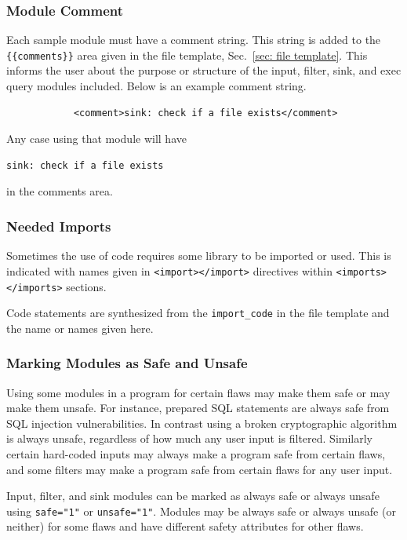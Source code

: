 \documentclass[12pt]{article}
\begin{document}
\subsubsection{Module Comment}
\label{sec:module comment}

Each sample module must have a comment string.  This string is added to the
\verb|{{comments}}| area given in the file template, Sec.~\ref{sec: file template}.
This informs the user about the purpose or structure of the input, filter, sink, and
exec query modules included.  Below is an example comment string.

\begin{verbatim}
            <comment>sink: check if a file exists</comment>
\end{verbatim}

Any case using that module will have
\begin{verbatim}
sink: check if a file exists
\end{verbatim}
in the comments area.


\subsubsection{Needed Imports}
\label{sec:module import}

Sometimes the use of code requires some library to be imported or used.  This is
indicated with names given in \verb|<import></import>| directives within
\verb|<imports></imports>| sections.

Code statements are synthesized from the \verb|import_code| in the file template and
the name or names given here.


\subsubsection{Marking Modules as Safe and Unsafe}
\label{sec:safe or unsafe}

Using some modules in a program for certain flaws may make them safe or may make them
unsafe.  For instance, prepared SQL statements are always safe from SQL injection
vulnerabilities.  In contrast using a broken cryptographic algorithm is always
unsafe, regardless of how much any user input is filtered.  Similarly certain
hard-coded inputs may always make a program safe from certain flaws, and some filters
may make a program safe from certain flaws for any user input.

Input, filter, and sink modules can be marked as always safe or always unsafe using
\verb|safe="1"| or \verb|unsafe="1"|.  Modules may be always safe or always unsafe
(or neither) for some flaws and have different safety attributes for other
flaws.
\end{document}
